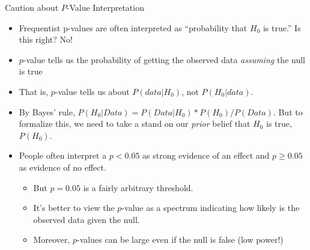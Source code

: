 \documentclass[11pt,english,handout]{beamer}
\newenvironment{wideitemize}{\itemize\addtolength{\itemsep}{10pt}}{\enditemize}
\begin{document}
\begin{frame}{Caution about $P$-Value Interpretation}

\begin{itemize}
\item Frequentist p-values are often interpreted as ``probability that $H_0$ is true.'' Is this right? \pause{} No!


\begin{wideitemize}
	\item $p$-value tells us the probability of getting the observed data \emph{assuming} the null is true
	
	\item That is, $p$-value tells us about $P(data | H_0)$, not $P(H_0 | data)$. 

	\item By Bayes' rule, $P(H_0 | Data) = P(Data | H_0) * P(H_0) / P(Data)$. But to formalize this, we need to take a stand on our \emph{prior} belief that $H_0$ is true, $P(H_0)$. 
	
\end{wideitemize}


\pause
\bigskip
\item People often interpret a $p<0.05$ as strong evidence of an effect and $p \geq 0.05$ as evidence of no effect. 

	\begin{itemize}
		\item 
		But $p=0.05$ is a fairly arbitrary threshold. 
		\vspace{0.1cm}
		\item
		It's better to view the $p$-value as a spectrum indicating how likely is the observed data given the null.  \pause
		\vspace{0.1cm}
		\item
		Moreover, $p$-values can be large even if the null is false (low power!)
	\end{itemize}
\end{itemize}

\end{frame}
\end{document}
